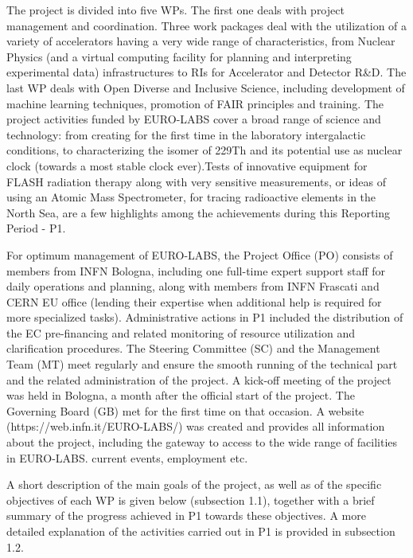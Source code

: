 The project is divided into five \acrfull{WP}s. The first one deals with project management and coordination. Three work packages deal with the utilization of a variety of accelerators having a very wide range of characteristics, from Nuclear Physics (and a virtual computing facility for planning and interpreting experimental data) infrastructures to RIs for Accelerator and Detector R\&D. The last WP deals with Open Diverse and Inclusive Science, including development of machine learning techniques, promotion of FAIR principles and training.  The project activities funded by EURO-LABS cover a broad range of science and technology: from creating for the first time in the laboratory intergalactic conditions, to characterizing the isomer of 229Th and its potential use as nuclear clock (towards a most stable clock ever).Tests of innovative equipment for FLASH radiation therapy along with very sensitive measurements,  or ideas of using an Atomic Mass Spectrometer, for tracing radioactive elements in the North Sea, are a few highlights among the achievements during this Reporting Period - P1.

For optimum management of EURO-LABS, the Project Office (PO) consists of members from INFN Bologna, including one full-time expert support staff for daily operations and planning, along with members from INFN Frascati and CERN EU office (lending their expertise when additional help is required for more specialized tasks). Administrative actions in P1 included the distribution of the EC pre-financing and related monitoring of resource utilization and clarification procedures. The Steering Committee (SC) and the Management Team (MT) meet regularly and ensure the smooth running of the technical part and the related administration of the project. A kick-off meeting of the project was held in Bologna, a month after the official start of the project. The Governing Board (GB) met for the first time on that occasion. A website (https://web.infn.it/EURO-LABS/) was created and provides all information about the project, including the gateway to access to the wide range of facilities in EURO-LABS. current events, employment etc.

A short description of the main goals of the project, as well as of the specific objectives of each WP is given below (subsection 1.1), together with a brief summary of the progress achieved in P1 towards these objectives. A more detailed explanation of the activities carried out in P1 is provided in subsection 1.2. 

